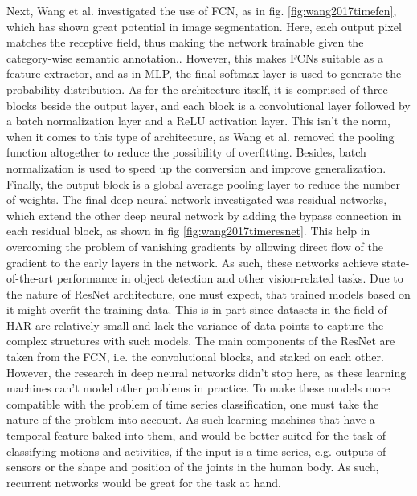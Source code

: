 			Next, Wang et al. investigated the use of FCN, as in fig. \ref{fig:wang2017timefcn}, which has shown great potential in image segmentation. Here, each output pixel matches the receptive field, thus making the network trainable given the category-wise semantic annotation.\cite{wang2017time}. However, this makes FCNs suitable as a feature extractor, and as in MLP, the final softmax layer is used to generate the probability distribution. As for the architecture itself, it is comprised of three blocks beside the output layer, and each block is a convolutional layer followed by a batch normalization layer and a ReLU activation layer. This isn't the norm, when it comes to this type of architecture, as Wang et al. removed the pooling function altogether to reduce the possibility of overfitting. Besides, batch normalization is used to speed up the conversion and improve generalization. Finally, the output block is a global average pooling layer to reduce the number of weights\cite{wang2017time}.\newline
			The final deep neural network investigated was residual networks, which extend the other deep neural network by adding the bypass connection in each residual block, as shown in fig \ref{fig:wang2017timeresnet}. This help in overcoming the problem of vanishing gradients by allowing direct flow of the gradient to the early layers in the network. As such, these networks achieve state-of-the-art performance in object detection and other vision-related tasks. Due to the nature of ResNet architecture, one must expect, that trained models based on it might overfit the training data. This is in part since datasets in the field of HAR are relatively small and lack the variance of data points to capture the complex structures with such models. The main components of the ResNet are taken from the FCN, i.e. the convolutional blocks, and staked on each other\cite{wang2017time}.\newline
			However, the research in deep neural networks didn't stop here, as these learning machines can't model other problems in practice. To make these models more compatible with the problem of time series classification, one must take the nature of the problem into account. As such learning machines that have a temporal feature baked into them, and would be better suited for the task of classifying motions and activities, if the input is a time series, e.g. outputs of sensors or the shape and position of the joints in the human body. As such, recurrent networks would be great for the task at hand.
